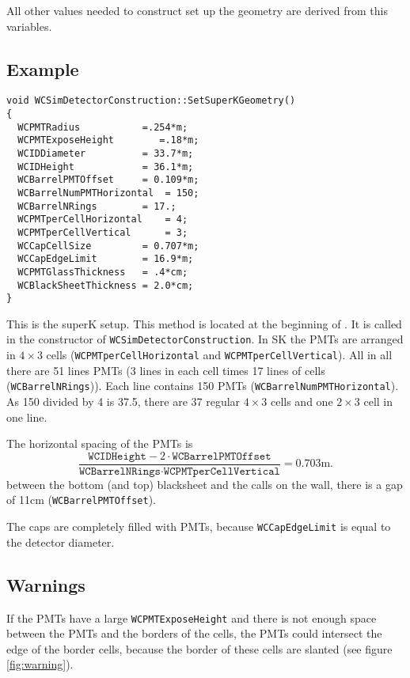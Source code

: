 All other values needed to construct set up the geometry are derived from this variables.

\subsection{Example}

\begin{verbatim}
void WCSimDetectorConstruction::SetSuperKGeometry()
{
  WCPMTRadius           =.254*m;
  WCPMTExposeHeight        =.18*m;
  WCIDDiameter          = 33.7*m;
  WCIDHeight            = 36.1*m;
  WCBarrelPMTOffset     = 0.109*m;
  WCBarrelNumPMTHorizontal  = 150;
  WCBarrelNRings        = 17.;
  WCPMTperCellHorizontal    = 4;
  WCPMTperCellVertical      = 3;
  WCCapCellSize         = 0.707*m;
  WCCapEdgeLimit        = 16.9*m;
  WCPMTGlassThickness   = .4*cm;
  WCBlackSheetThickness = 2.0*cm;
}
\end{verbatim}

This is the superK setup. This method is located at the beginning of . It is called in the constructor of \texttt{WCSimDetectorConstruction}.
In SK the PMTs are arranged in $4 \times 3$ cells (\texttt{WCPMTperCellHorizontal} and \texttt{WCPMTperCellVertical}). 
All in all there are 51 lines PMTs (3 lines in each cell times 17 lines of cells (\texttt{WCBarrelNRings})). Each line contains 150 PMTs (\texttt{WCBarrelNumPMTHorizontal}). As 150 divided by 4 is 37.5, there are 37 regular $4 \times 3$ cells and one $2 \times 3$ cell in one line.

The horizontal spacing of the PMTs is
\[
\frac{\texttt{WCIDHeight} - 2\cdot\texttt{WCBarrelPMTOffset}}
{\texttt{WCBarrelNRings} \cdot \texttt{WCPMTperCellVertical}}
= 0.703 \mathrm{m}.
\]
between the bottom (and top) blacksheet and the calls on the wall, there is a gap of 11cm (\texttt{WCBarrelPMTOffset}).

The caps are completely filled with PMTs, because \texttt{WCCapEdgeLimit} is equal to the detector diameter. 



\subsection{Warnings}
If the PMTs have a large \texttt{WCPMTExposeHeight} and there is not enough space between the PMTs and the borders of the cells, the PMTs could intersect the edge of the border cells, because the border of these cells are slanted (see figure \ref{fig:warning}). 

